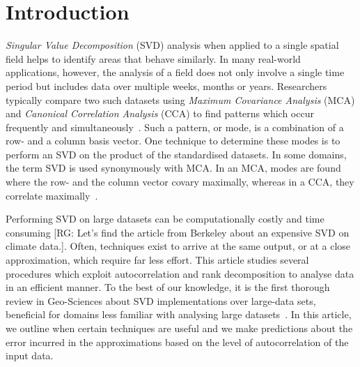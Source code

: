 \documentclass[ijgi,article,submit,moreauthors,pdftex,10pt,a4paper]{Definitions/mdpi}
\begin{document}
\section{Introduction}
\label{sec:Introduction}


\textit{Singular Value Decomposition} (SVD) analysis when applied to a single spatial field helps to identify areas that behave similarly. In many real-world applications, however, the analysis of a field does not only involve a single time period but includes data over multiple weeks, months or years. Researchers typically compare two such datasets using \textit{Maximum Covariance Analysis} (MCA) and \textit{Canonical Correlation Analysis} (CCA) to find patterns which occur frequently and simultaneously~\cite{Eshel2011, Storch1999}. Such a pattern, or mode, is a combination of a row- and a column basis vector. One technique to determine these modes is to perform an SVD on the product of the standardised datasets. In some domains, the term SVD is used synonymously with MCA. In an MCA, modes are found where the row- and the column vector covary maximally, whereas in a CCA, they correlate maximally~\cite{Bretherton1992}.

Performing SVD on large datasets can be computationally costly and time consuming [RG: Let's find the article from Berkeley about an expensive SVD on climate data.]. Often, techniques exist to arrive at the same output, or at a close approximation, which require far less effort. This article studies several procedures which exploit autocorrelation and rank decomposition to analyse data in an efficient manner. To the best of our knowledge, it is the first thorough review in Geo-Sciences about SVD implementations over large-data sets, beneficial for domains less familiar with analysing large datasets~\cite{Golub1970, Bjorck1973, Chan1982}. In this article, we outline when certain techniques are useful and we make predictions about the error incurred in the approximations based on the level of autocorrelation of the input data.
\end{document}
